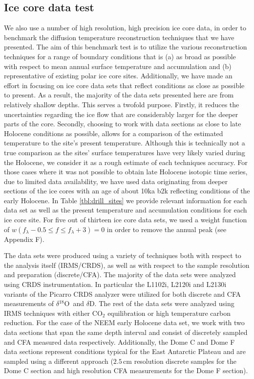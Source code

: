 \documentclass[11pt, draftcls, onecolumn]{IEEEtran} %
\numberwithin{equation}{section}
\numberwithin{table}{section}
\numberwithin{figure}{section}
\newcommand{\delOx}{$\delta{}^{18}\mathrm{O}$}
\newcommand{\delD}{$\delta\mathrm{D}$}
\begin{document}
\subsection{Ice core data test} \label{sec:icecore_results}
We also use a number of high resolution, high precision ice core data, in order to benchmark the 
diffusion temperature reconstruction techniques that we have  presented.
The aim of this benchmark test is to utilize the various reconstruction techniques for a range of
boundary conditions that is (a) as broad as possible with respect to mean annual surface temperature 
and accumulation and (b) representative of existing polar ice core sites.
Additionally, we have made an effort in focusing on ice core  data sets that reflect conditions as close as possible to 
present. As a result, the majority of the data sets presented here are from relatively shallow depths. 
This serves a twofold purpose. 
Firstly, it reduces the uncertainties regarding the ice flow that are considerably
larger for the deeper parts of the core. 
Secondly, choosing to work with data sections as close to late Holocene
conditions as possible, allows for a comparison of the estimated temperature to the site's present temperature.
Although this is technically not a true comparison as the sites' surface temperatures have very likely
varied during the Holocene, we consider  it as a rough estimate of each techniques accuracy.
For those cases where it was not possible to obtain late Holocene isotopic time series, due to limited data availability,
we have used data originating from deeper sections of the ice cores with an age  
of about 10ka b2k reflecting conditions of  the early Holocene. In Table \ref{tbl:drill_sites} we provide relevant 
information for each data set as well as the present 
temperature and accumulation conditions for each ice core site.
For five out of thirteen ice core data sets, we used a weight function of $w(f_{\lambda} - 0.5 \leq f \leq
f_{\lambda} + 3) = 0$ in order to remove the annual peak (see Appendix F).

The data sets were produced using a variety of techniques
both with respect to the analysis itself (IRMS/CRDS), as well as with respect to the sample resolution and preparation
(discrete/CFA). 
The majority of the data sets were analyzed using CRDS instrumentation. In particular the L1102i, L2120i and L2130i
variants of the Picarro CRDS analyzer were utilized for both discrete and CFA measurements of \delOx~and \delD.
The rest of the data sets were analyzed using IRMS techniques with either $\mathrm{CO}_2$ equilibration or 
high temperature carbon reduction. 
For the case of the NEEM early Holocene data set, we work with two data sections that span the same 
depth interval and consist of discretely sampled and CFA measured data respectively.
Additionally, the Dome C and Dome F data sections represent conditions typical for the East Antarctic Plateau and are sampled
using a different approach ($2.5 \, \mathrm{cm}$ resolution discrete samples for the Dome C section and high resolution CFA measurements
for the Dome F section).
\end{document}
